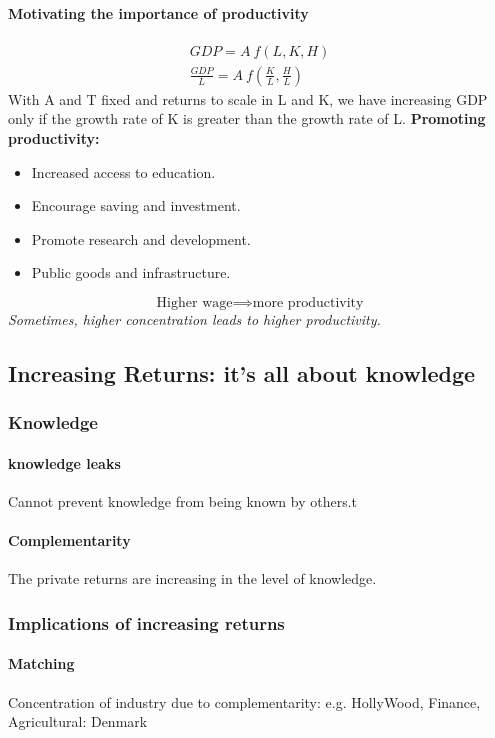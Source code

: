 \documentclass[11pt]{article}
\begin{document}
	\paragraph{Motivating the importance of productivity}
	\begin{align*}
		GDP = A\ f(L,K,H) \\
		\frac{GDP}{L} = A\ f(\frac{K}{L}, \frac{H}{L})
	\end{align*}
	With A and T fixed and  returns to scale in L and K, we have increasing GDP only if the growth rate of K is greater than the growth rate of L.
	\newline \textbf{Promoting productivity:}
	\begin{itemize}
		\item Increased access to education.
		\item Encourage saving and investment.
		\item Promote research and development.
		\item Public goods and infrastructure.
	\end{itemize}
	\[
		\text{Higher wage} \implies \text{more productivity}
	\]
	\emph{Sometimes, higher concentration leads to higher productivity.}
	\subsection{Increasing Returns: it's all about knowledge}
	\subsubsection{Knowledge}
	\paragraph{knowledge leaks} Cannot prevent knowledge from being known by others.t
	\paragraph{Complementarity} The private returns are increasing in the level of knowledge.
	\subsubsection{Implications of increasing returns}
	\paragraph{Matching} Concentration of industry due to complementarity: e.g. HollyWood, Finance, Agricultural: Denmark
\end{document}
